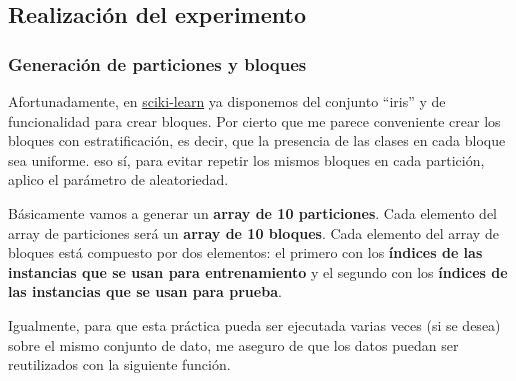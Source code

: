 \documentclass[11pt]{article}
\begin{document}
    \subsection{Realización del
experimento}\label{realizaciuxf3n-del-experimento}

\subsubsection{Generación de particiones y
bloques}\label{generaciuxf3n-de-particiones-y-bloques}

Afortunadamente, en \href{http://scikit-learn.org}{sciki-learn} ya
disponemos del conjunto ``iris'' y de funcionalidad para crear bloques.
Por cierto que me parece conveniente crear los bloques con
estratificación, es decir, que la presencia de las clases en cada bloque
sea uniforme. eso sí, para evitar repetir los mismos bloques en cada
partición, aplico el parámetro de aleatoriedad.

Básicamente vamos a generar un \textbf{array de 10 particiones}. Cada
elemento del array de particiones será un \textbf{array de 10 bloques}.
Cada elemento del array de bloques está compuesto por dos elementos: el
primero con los \textbf{índices de las instancias que se usan para
entrenamiento} y el segundo con los \textbf{índices de las instancias
que se usan para prueba}.

Igualmente, para que esta práctica pueda ser ejecutada varias veces (si
se desea) sobre el mismo conjunto de dato, me aseguro de que los datos
puedan ser reutilizados con la siguiente función.
\end{document}
